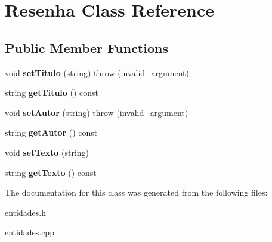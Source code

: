 \hypertarget{classResenha}{}\section{Resenha Class Reference}
\label{classResenha}
\subsection*{Public Member Functions}
\begin{DoxyCompactItemize}
\item 
\mbox{\label{classResenha_a4f2bf94388381e3ce05fe5d63ac23e4f}} 
void {\bfseries set\+Titulo} (string)  throw (invalid\+\_\+argument)
\item 
\mbox{\label{classResenha_a8c0966bc51ba8d43c769594446797d9f}} 
string {\bfseries get\+Titulo} () const
\item 
\mbox{\label{classResenha_a93b2d590fce3efecb9d1a2a5c1ab4ef1}} 
void {\bfseries set\+Autor} (string)  throw (invalid\+\_\+argument)
\item 
\mbox{\label{classResenha_a9ba7b00c49de97e2c29caba9b229dfab}} 
string {\bfseries get\+Autor} () const
\item 
\mbox{\label{classResenha_a6fd61b3ffeee4365aa8aaab69b16d41a}} 
void {\bfseries set\+Texto} (string)
\item 
\mbox{\label{classResenha_a17b193d598f0b50f90310a67afc0b524}} 
string {\bfseries get\+Texto} () const
\end{DoxyCompactItemize}


The documentation for this class was generated from the following files\+:\begin{DoxyCompactItemize}
\item 
entidades.\+h\item 
entidades.\+cpp\end{DoxyCompactItemize}
